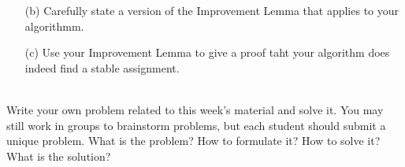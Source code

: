 \documentclass[11pt]{article}
\begin{document}
\begin{qunlist}
\begin{itemize}
\item[(b)] Carefully state a version of the Improvement Lemma that applies to your algorithmm.

\item[(c)] Use your Improvement Lemma to give a proof taht your algorithm does indeed find a stable assignment.

\end{itemize}











 \\

Write your own problem related to this week's material and solve it. You may still work in groups to brainstorm problems, but each student should submit a unique problem. What is the problem? How to formulate it? How to
solve it? What is the solution?


\end{qunlist}
\end{document}
